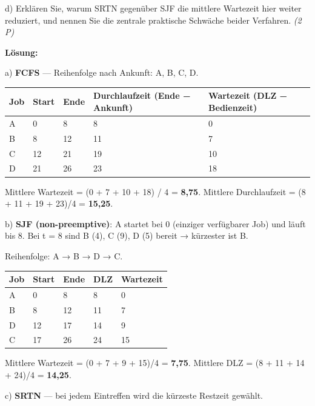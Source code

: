 \documentclass[11pt, a4paper]{article}
\begin{document}
d) Erklären Sie, warum SRTN gegenüber SJF die mittlere Wartezeit hier weiter reduziert, und nennen Sie die zentrale praktische Schwäche beider Verfahren. \textit{(2 P)}


\textbf{Lösung:}


a) \textbf{FCFS} — Reihenfolge nach Ankunft: A, B, C, D.



{\small
\begin{tabularx}{\linewidth}{XXXXX}
\hline
\rowcolor{tableheadbg}
{\color{white}\textbf{Job}} & {\color{white}\textbf{Start}} & {\color{white}\textbf{Ende}} & {\color{white}\textbf{Durchlaufzeit (Ende − Ankunft)}} & {\color{white}\textbf{Wartezeit (DLZ − Bedienzeit)}} \\[2pt]
\hline
\endhead
\hline
\endfoot
A & 0 & 8 & 8 & 0 \\
B & 8 & 12 & 11 & 7 \\
C & 12 & 21 & 19 & 10 \\
D & 21 & 26 & 23 & 18 \\
\end{tabularx}
}


Mittlere Wartezeit = (0 + 7 + 10 + 18) / 4 = \textbf{8,75}. Mittlere Durchlaufzeit = (8 + 11 + 19 + 23)/4 = \textbf{15,25}.


b) \textbf{SJF (non-preemptive)}: A startet bei 0 (einziger verfügbarer Job) und läuft bis 8. Bei t = 8 sind B (4), C (9), D (5) bereit → kürzester ist B.

Reihenfolge: A → B → D → C.



{\small
\begin{tabularx}{\linewidth}{XXXXX}
\hline
\rowcolor{tableheadbg}
{\color{white}\textbf{Job}} & {\color{white}\textbf{Start}} & {\color{white}\textbf{Ende}} & {\color{white}\textbf{DLZ}} & {\color{white}\textbf{Wartezeit}} \\[2pt]
\hline
\endhead
\hline
\endfoot
A & 0 & 8 & 8 & 0 \\
B & 8 & 12 & 11 & 7 \\
D & 12 & 17 & 14 & 9 \\
C & 17 & 26 & 24 & 15 \\
\end{tabularx}
}


Mittlere Wartezeit = (0 + 7 + 9 + 15)/4 = \textbf{7,75}. Mittlere DLZ = (8 + 11 + 14 + 24)/4 = \textbf{14,25}.


c) \textbf{SRTN} — bei jedem Eintreffen wird die kürzeste Restzeit gewählt.
\end{document}
